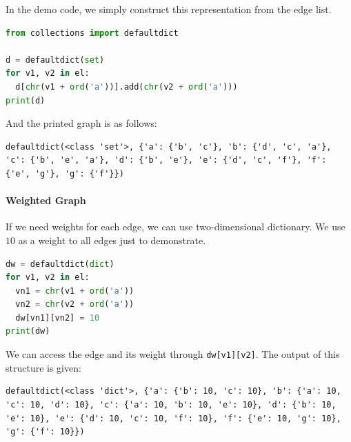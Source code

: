 \documentclass[../main.tex]{subfiles}
\begin{document}
In the demo code, we simply construct this representation from the edge list.
\begin{lstlisting}[language=Python]
from collections import defaultdict

d = defaultdict(set)
for v1, v2 in el:
  d[chr(v1 + ord('a'))].add(chr(v2 + ord('a')))
print(d)
\end{lstlisting}
And the printed graph is as follows:
\begin{lstlisting}[numbers=none]
defaultdict(<class 'set'>, {'a': {'b', 'c'}, 'b': {'d', 'c', 'a'}, 'c': {'b', 'e', 'a'}, 'd': {'b', 'e'}, 'e': {'d', 'c', 'f'}, 'f': {'e', 'g'}, 'g': {'f'}})
\end{lstlisting}
\paragraph{Weighted Graph} If we need weights for each edge, we can use two-dimensional dictionary. We use $10$ as a weight to all edges just to demonstrate. 
\begin{lstlisting}[language=Python]
dw = defaultdict(dict)
for v1, v2 in el:
  vn1 = chr(v1 + ord('a'))
  vn2 = chr(v2 + ord('a'))
  dw[vn1][vn2] = 10
print(dw)
\end{lstlisting}
We can access the edge and its weight through \texttt{dw[v1][v2]}. The output of this structure is given:
\begin{lstlisting}[numbers=none]
defaultdict(<class 'dict'>, {'a': {'b': 10, 'c': 10}, 'b': {'a': 10, 'c': 10, 'd': 10}, 'c': {'a': 10, 'b': 10, 'e': 10}, 'd': {'b': 10, 'e': 10}, 'e': {'d': 10, 'c': 10, 'f': 10}, 'f': {'e': 10, 'g': 10}, 'g': {'f': 10}})
\end{lstlisting}







\end{document}
